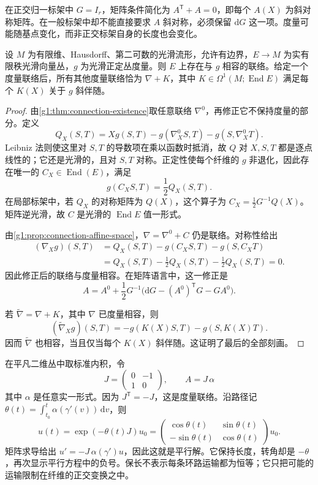 在正交归一标架中 \(G=I_r\)，矩阵条件简化为 \(A^{\mathsf T}+A=0\)，即每个 \(A(X)\) 为斜对称矩阵。在一般标架中却不能直接要求 \(A\) 斜对称，必须保留 \(\mathrm{d}G\) 这一项。度量可能随基点变化，而非正交标架自身的长度也会变化。

\begin{proposition}\label{g1:prop:metric-connection-existence}
	设 \(M\) 为有限维、Hausdorff、第二可数的光滑流形，允许有边界，\(E\to M\) 为实有限秩光滑向量丛，\(g\) 为光滑正定丛度量。则 \(E\) 上存在与 \(g\) 相容的联络。给定一个度量联络后，所有其他度量联络恰为 \(\nabla+K\)，其中 \(K\in\Omega^1(M;\operatorname{End}E)\) 满足每个 \(K(X)\) 关于 \(g\) 斜伴随。
\end{proposition}
\begin{proof}
	由\cref{g1:thm:connection-existence}取任意联络 \(\nabla^0\)，再修正它不保持度量的部分。定义
	\[
		Q_X(S,T)=Xg(S,T)-g(\nabla^0_XS,T)-g(S,\nabla^0_XT).
	\]
	Leibniz 法则使这里对 \(S,T\) 的导数项在乘以函数时抵消，故 \(Q\) 对 \(X,S,T\) 都是逐点线性的；它还是光滑的，且对 \(S,T\) 对称。正定性使每个纤维的 \(g\) 非退化，因此存在唯一的 \(C_X\in\operatorname{End}(E)\)，满足
	\[
		g(C_XS,T)=\frac12Q_X(S,T).
	\]
	在局部标架中，若 \(Q_X\) 的对称矩阵为 \(Q(X)\)，这个算子为 \(C_X=\tfrac12G^{-1}Q(X)\)。矩阵逆光滑，故 \(C\) 是光滑的 \(\operatorname{End}E\) 值一形式。

	由\cref{g1:prop:connection-affine-space}，\(\nabla=\nabla^0+C\) 仍是联络。对称性给出
	\begin{align*}
		(\nabla_Xg)(S,T)&=Q_X(S,T)-g(C_XS,T)-g(S,C_XT)\\
		&=Q_X(S,T)-\tfrac12Q_X(S,T)-\tfrac12Q_X(S,T)=0.
	\end{align*}
	因此修正后的联络与度量相容。在矩阵语言中，这一修正是
	\[
		A=A^0+\frac12G^{-1}\bigl(\mathrm{d}G-(A^0)^{\mathsf T}G-GA^0\bigr).
	\]

	若 \(\widetilde\nabla=\nabla+K\)，其中 \(\nabla\) 已度量相容，则
	\[
		(\widetilde\nabla_Xg)(S,T)=-g(K(X)S,T)-g(S,K(X)T).
	\]
	因而 \(\widetilde\nabla\) 也相容，当且仅当每个 \(K(X)\) 斜伴随。这证明了最后的全部刻画。
\end{proof}

\begin{example}\label{g1:exm:rotating-metric-transport}
	在平凡二维丛中取标准内积，令
	\[
		J=\begin{pmatrix}0&-1\\1&0\end{pmatrix},\qquad A=J\,\alpha
	\]
	其中 \(\alpha\) 是任意实一形式。因为 \(J^{\mathsf T}=-J\)，这是度量联络。沿路径记 \(\theta(t)=\int_{t_0}^t \alpha(\gamma'(v))\,\mathrm{d}v\)，则
	\[
		u(t)=\exp(-\theta(t)J)u_0
		=\begin{pmatrix}\cos\theta(t)&\sin\theta(t)\\-\sin\theta(t)&\cos\theta(t)\end{pmatrix}u_0.
	\]
	矩阵求导给出 \(u'=-J\,\alpha(\gamma')u\)，因此这就是平行解。它保持长度，转角却是 \(-\theta\)，再次显示平行方程中的负号。保长不表示每条环路运输都为恒等；它只把可能的运输限制在纤维的正交变换之中。
\end{example}

